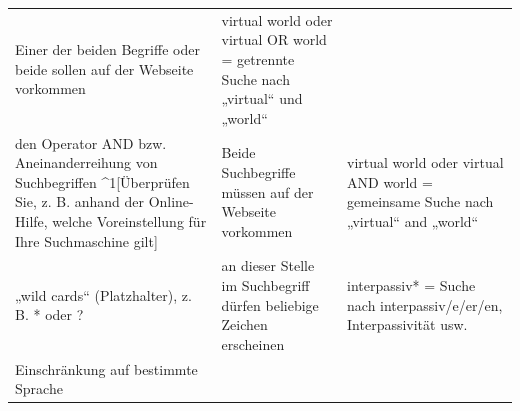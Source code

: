\documentclass[]{book}
\theoremstyle{definition}
\theoremstyle{definition}
\theoremstyle{definition}
\theoremstyle{remark}
\begin{document}
\begin{longtable}[]{@{}lll@{}}
\begin{minipage}[t]{0.27\columnwidth}
Einer der beiden Begriffe oder beide sollen auf der Webseite vorkommen
\vspace{5mm}\strut
\end{minipage} & \begin{minipage}[t]{0.33\columnwidth}\raggedright\strut
virtual world oder virtual OR world = getrennte Suche nach „virtual``
und „world`` \vspace{5mm}\strut
\end{minipage}\tabularnewline
\begin{minipage}[t]{0.31\columnwidth}\raggedright\strut
den Operator AND bzw. Aneinanderreihung von Suchbegriffen
\^{}1{[}Überprüfen Sie, z. B. anhand der Online-Hilfe, welche
Voreinstellung für Ihre Suchmaschine gilt{]} \vspace{5mm}\strut
\end{minipage} & \begin{minipage}[t]{0.27\columnwidth}\raggedright\strut
Beide Suchbegriffe müssen auf der Webseite vorkommen \vspace{5mm}\strut
\end{minipage} & \begin{minipage}[t]{0.33\columnwidth}\raggedright\strut
virtual world oder virtual AND world = gemeinsame Suche nach „virtual``
and „world`` \vspace{5mm}\strut
\end{minipage}\tabularnewline
\begin{minipage}[t]{0.31\columnwidth}\raggedright\strut
„wild cards`` (Platzhalter), z. B. * oder ? \vspace{5mm}\strut
\end{minipage} & \begin{minipage}[t]{0.27\columnwidth}\raggedright\strut
an dieser Stelle im Suchbegriff dürfen beliebige Zeichen erscheinen
\vspace{5mm}\strut
\end{minipage} & \begin{minipage}[t]{0.33\columnwidth}\raggedright\strut
interpassiv* = Suche nach interpassiv/e/er/en, Interpassivität usw.
\vspace{5mm}\strut
\end{minipage}\tabularnewline
\begin{minipage}[t]{0.31\columnwidth}\raggedright\strut
Einschränkung auf bestimmte Sprache \vspace{5mm}\strut
\end{minipage} & \begin{minipage}[t]{0.27\columnwidth}\raggedright\strut

\end{minipage}
\end{longtable}
\end{document}
